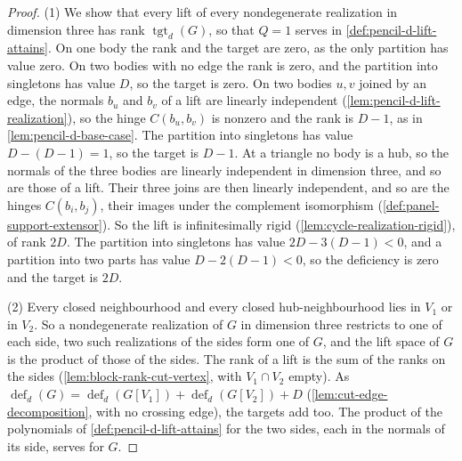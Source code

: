 \begin{proof}
  \leanok
  (1) We show that every lift of every nondegenerate realization in
  dimension three has rank $\operatorname{tgt}_d(G)$, so that $Q = 1$
  serves in \cref{def:pencil-d-lift-attains}. On one body the rank and
  the target are zero, as the only partition has value zero. On two
  bodies with no edge the rank is zero, and the partition into singletons
  has value $D$, so the target is zero. On two bodies $u, v$ joined by an
  edge, the normals $b_u$ and $b_v$ of a lift are linearly independent
  (\cref{lem:pencil-d-lift-realization}), so the hinge $C(b_u, b_v)$ is
  nonzero and the rank is $D - 1$, as in \cref{lem:pencil-d-base-case}.
  The partition into singletons has value $D - (D - 1) = 1$, so the
  target is $D - 1$. At a triangle no body is a hub, so the normals of
  the three bodies are linearly independent in dimension three, and so
  are those of a lift. Their three joins are then linearly independent,
  and so are the hinges $C(b_i, b_j)$, their images under the complement
  isomorphism (\cref{def:panel-support-extensor}). So the lift is
  infinitesimally rigid (\cref{lem:cycle-realization-rigid}), of rank
  $2D$. The partition into singletons has value $2D - 3(D - 1) < 0$, and
  a partition into two parts has value $D - 2(D - 1) < 0$, so the
  deficiency is zero and the target is $2D$.

  (2) Every closed neighbourhood and every closed hub-neighbourhood lies
  in $V_1$ or in $V_2$. So a nondegenerate realization of $G$ in
  dimension three restricts to one of each side, two such realizations of
  the sides form one of $G$, and the lift space of $G$ is the product of
  those of the sides. The rank of a lift is the sum of the ranks on the
  sides (\cref{lem:block-rank-cut-vertex}, with $V_1 \cap V_2$ empty). As
  $\operatorname{def}_d(G) = \operatorname{def}_d(G[V_1]) +
  \operatorname{def}_d(G[V_2]) + D$ (\cref{lem:cut-edge-decomposition},
  with no crossing edge), the targets add too. The product of the
  polynomials of \cref{def:pencil-d-lift-attains} for the two sides,
  each in the normals of its side, serves for $G$.
\end{proof}

